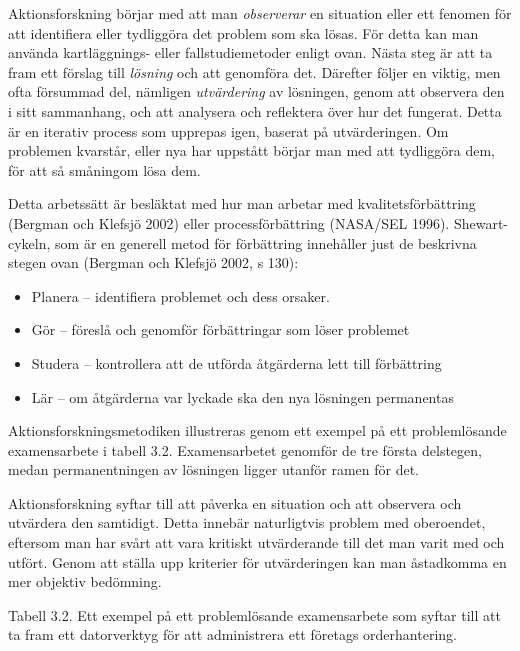 Aktionsforskning börjar med att man \emph{observerar} en situation eller
ett fenomen för att identifiera eller tydliggöra det problem som ska
lösas. För detta kan man använda kartläggnings- eller fallstudiemetoder
enligt ovan. Nästa steg är att ta fram ett förslag till \emph{lösning}
och att genomföra det. Därefter följer en viktig, men ofta försummad
del, nämligen \emph{utvärdering} av lösningen, genom att observera den i
sitt sammanhang, och att analysera och reflektera över hur det fungerat.
Detta är en iterativ process som upprepas igen, baserat på
utvärderingen. Om problemen kvarstår, eller nya har uppstått börjar man
med att tydliggöra dem, för att så småningom lösa dem.

Detta arbetssätt är besläktat med hur man arbetar med
kvalitetsförbättring (Bergman och Klefsjö 2002) eller processförbättring
(NASA/SEL 1996). Shewart-cykeln, som är en generell metod för
förbättring innehåller just de beskrivna stegen ovan (Bergman och
Klefsjö 2002, s 130):

\begin{itemize}
\item
  Planera -- identifiera problemet och dess orsaker.
\item
  Gör -- föreslå och genomför förbättringar som löser problemet
\item
  Studera -- kontrollera att de utförda åtgärderna lett till förbättring
\item
  Lär -- om åtgärderna var lyckade ska den nya lösningen permanentas
\end{itemize}

Aktionsforskningsmetodiken illustreras genom ett exempel på ett
problemlösande examensarbete i tabell 3.2. Examensarbetet genomför de
tre första delstegen, medan permanentningen av lösningen ligger utanför
ramen för det.

Aktionsforskning syftar till att påverka en situation och att observera
och utvärdera den samtidigt. Detta innebär naturligtvis problem med
oberoendet, eftersom man har svårt att vara kritiskt utvärderande till
det man varit med och utfört. Genom att ställa upp kriterier för
utvärderingen kan man åstadkomma en mer objektiv bedömning.

Tabell 3.2. Ett exempel på ett problemlösande examensarbete som syftar
till att ta fram ett datorverktyg för att administrera ett företags
orderhantering.

